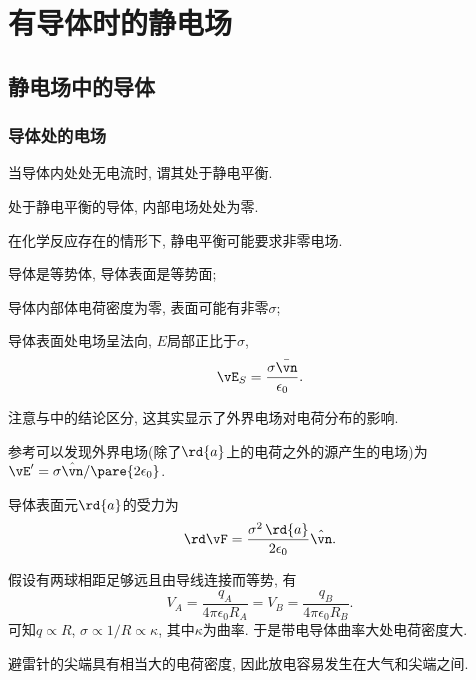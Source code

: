 \documentclass[../Electromagnetism.tex]{subfiles}
\begin{document}
\section{有导体时的静电场} %
\label{sec:有导体时的静电场}

\subsection{静电场中的导体} %
\label{sub:静电场中的导体}

\subsubsection{导体处的电场} %
\label{ssub:导体处的电场}

\begin{definition}[导体中的静电平衡]
	当导体内处处无电流时, 谓其处于静电平衡.
\end{definition}
\begin{corollary}[静电平衡条件]
	处于静电平衡的导体, 内部电场处处为零.
\end{corollary}
\begin{remark}
	\label{rm:静电平衡可能要求非零电场}
	在化学反应存在的情形下, 静电平衡可能要求非零电场.
\end{remark}
\begin{corollary}[导体附近电场的性质]\quad
	\begin{cenum}
		\item 导体是等势体, 导体表面是等势面;
		\item 导体内部体电荷密度为零, 表面可能有非零$\sigma$;
		\item 导体表面处电场呈法向, $E$局部正比于$\sigma$,
		\[ \vE_S = \frac{\sigma \bar{\vn}}{\epsilon_0}. \]
	\end{cenum}
\end{corollary}
\begin{remark}
	注意与中的结论区分, 这其实显示了外界电场对电荷分布的影响.
\end{remark}
参考可以发现外界电场(除了$\rd{a}$上的电荷之外的源产生的电场)为$\vE' = \sigma\hat{\vn}/\pare{2\epsilon_0}$.
\begin{finale}
	\begin{corollary}[导体表面受力]
		导体表面元$\rd{a}$的受力为
		\begin{equation}
			\label{eq:导体表面元受力}
			\rd\vF = \frac{\sigma^2\,\rd{a}}{2\epsilon_0}\hat{\vn}.
		\end{equation}
	\end{corollary}
\end{finale}
假设有两球相距足够远且由导线连接而等势, 有
\[ V_A = \frac{q_A}{4\pi\epsilon_0 R_A} = V_B = \frac{q_B}{4\pi\epsilon_0 R_B}. \]
可知$q\propto R$, $\sigma \propto 1/R \propto \kappa$, 其中$\kappa$为曲率. 于是带电导体曲率大处电荷密度大.
\begin{ex}
	避雷针的尖端具有相当大的电荷密度, 因此放电容易发生在大气和尖端之间.
\end{ex}
\end{document}
